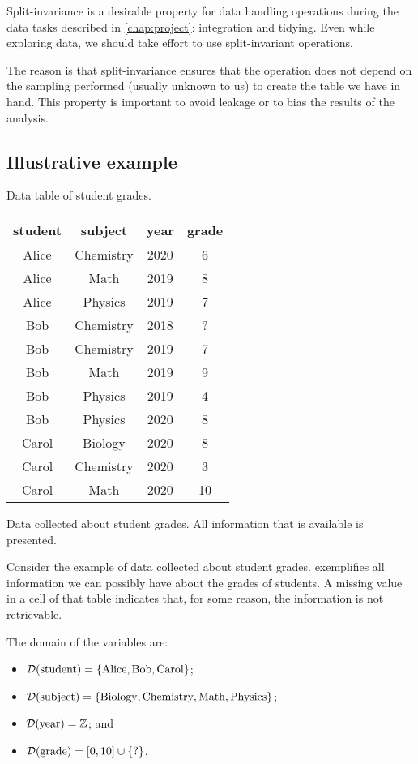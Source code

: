 Split-invariance is a desirable property for data handling operations during the data
tasks described in \cref{chap:project}: integration and tidying.  Even while exploring
data, we should take effort to use split-invariant operations.

The reason is that split-invariance ensures that the operation does not depend on the
sampling performed (usually unknown to us) to create the table we have in hand.  This
property is important to avoid \gls{leakage} or to bias the results of the analysis.

\subsection{Illustrative example}

\begin{tablebox}[label=tab:grades1]{Data table of student grades.}
  \centering
  \begin{tabular}{cccc}
    \toprule
    \textbf{student} & \textbf{subject} & \textbf{year} & \textbf{grade} \\
    \midrule
    Alice & Chemistry & 2020 & 6 \\
    Alice & Math & 2019 & 8 \\
    Alice & Physics & 2019 & 7 \\
    Bob & Chemistry & 2018 & ? \\
    Bob & Chemistry & 2019 & 7 \\
    Bob & Math & 2019 & 9 \\
    Bob & Physics & 2019 & 4 \\
    Bob & Physics & 2020 & 8 \\
    Carol & Biology & 2020 & 8 \\
    Carol & Chemistry & 2020 & 3 \\
    Carol & Math & 2020 & 10 \\
    \bottomrule
  \end{tabular}
  \tcblower
  Data collected about student grades.  All information that is available is presented.
\end{tablebox}

Consider the example of data collected about student grades.  
exemplifies all information we can possibly have about the grades of students.  A missing
value in a cell of that table indicates that, for some reason, the information is not
retrievable.

The domain of the variables are:
\begin{itemize}
  \itemsep0em
  \item $\mathcal{D}\!\left(\text{student}\right) = \left\{\text{Alice}, \text{Bob}, \text{Carol}\right\}$;
  \item $\mathcal{D}\!\left(\text{subject}\right) = \left\{\text{Biology}, \text{Chemistry}, \text{Math},
    \text{Physics}\right\}$;
  \item $\mathcal{D}\!\left(\text{year}\right) = \mathbb{Z}$; and
  \item $\mathcal{D}\!\left(\text{grade}\right) = \left[0, 10\right] \cup \left\{\text{?}\right\}$.
\end{itemize}

